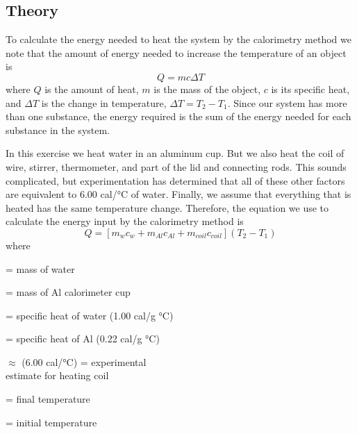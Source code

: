 \begin{multicols}{2}

\section{Theory}
To calculate the energy needed to heat the system by the calorimetry method we note that the amount of energy needed to increase the temperature of an object is
\begin{equation} \label{e:qheat1}
	Q = mc\Delta T 
\end{equation}
where $Q$ is the amount of heat, $m$ is the mass of the object, $c$ is its specific heat, and $\Delta T$ is the change in temperature, $\Delta T =T_2 - T_1$.  Since our system has more than one substance, the energy required is the sum of the energy needed for each substance in the system.

In this exercise we heat water in an aluminum cup.  But we also heat the coil of wire, stirrer, thermometer, and part of the lid and connecting rods.  This sounds complicated, but experimentation has determined that all of these other factors are equivalent to 6.00 cal/\si{\degree}C of water. Finally, we assume that everything that is heated has the same temperature change.  Therefore, the equation we use to calculate the energy input by the calorimetry method is
\begin{equation}\label{e:qheat2}
	Q = [m_wc_w + m_{Al}c_{Al} + m_{coil}c_{coil}](T_2 - T_1)
\end{equation}
where	
\begin{description}[itemsep=1pt]
	\item [$m_w$] = mass of water
	\item [$m_{Al}$]	= mass of Al calorimeter cup
	\item [$c_w$]	= specific heat of water (1.00 cal/g \si{\degree}C)
	\item [$c_{Al}$]	= specific heat of Al (0.22 cal/g \si{\degree}C)
	\item [$m_{coil}c_{coil}$] $\approx$ (6.00 cal/\si{\degree}C) = experimental \\estimate for heating coil
	\item [$T_2$]	= final temperature
	\item [$T_1$]	= initial temperature
\end{description}


\end{multicols}

